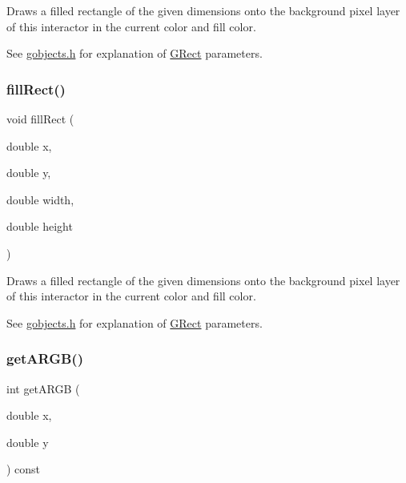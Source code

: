 Draws a filled rectangle of the given dimensions onto the background pixel layer of this interactor in the current color and fill color. 

See \mbox{\hyperlink{gobjects_8h_source}{gobjects.\+h}} for explanation of \mbox{\hyperlink{classsgl_1_1GRect}{G\+Rect}} parameters. \mbox{\label{classsgl_1_1GDrawingSurface_aac3ae7d3aee950de78eca0e108352254}} 
\subsubsection{\texorpdfstring{fill\+Rect()}{fillRect()}\hspace{0.1cm}{\footnotesize\ttfamily [2/2]}}
{\footnotesize\ttfamily void fill\+Rect (\begin{DoxyParamCaption}\item[{double}]{x,  }\item[{double}]{y,  }\item[{double}]{width,  }\item[{double}]{height }\end{DoxyParamCaption})\hspace{0.3cm}{\ttfamily [virtual]}}



Draws a filled rectangle of the given dimensions onto the background pixel layer of this interactor in the current color and fill color. 

See \mbox{\hyperlink{gobjects_8h_source}{gobjects.\+h}} for explanation of \mbox{\hyperlink{classsgl_1_1GRect}{G\+Rect}} parameters. \mbox{\label{classsgl_1_1GDrawingSurface_ae394d39f20476570e083918d991c25bd}} 
\subsubsection{\texorpdfstring{get\+A\+R\+G\+B()}{getARGB()}}
{\footnotesize\ttfamily int get\+A\+R\+GB (\begin{DoxyParamCaption}\item[{double}]{x,  }\item[{double}]{y }\end{DoxyParamCaption}) const\hspace{0.3cm}{\ttfamily [virtual]}}



